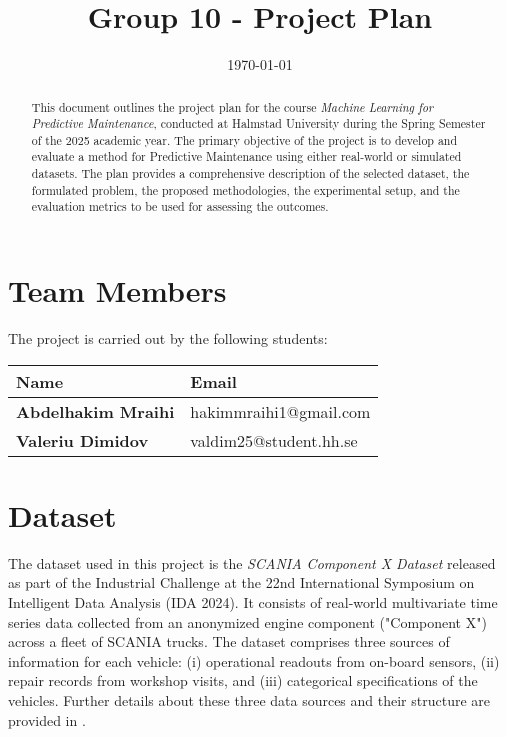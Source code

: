 \documentclass[a4paper,12pt]{article}
\title{Group 10 - Project Plan}
\date{\today}
\begin{document}
\maketitle

\begin{abstract}
This document outlines the project plan for the course \textit{Machine Learning for Predictive Maintenance}, conducted at Halmstad University during the Spring Semester of the 2025 academic year.
The primary objective of the project is to develop and evaluate a method for Predictive Maintenance using either real-world or simulated datasets. 
The plan provides a comprehensive description of the selected dataset, the formulated problem, the proposed methodologies, the experimental setup, and the evaluation metrics to be used for assessing the outcomes.

\end{abstract}

\section{Team Members}
The project is carried out by the following students:

\begin{table}[h!]
\centering
\renewcommand{\arraystretch}{1.2} %
\begin{tabularx}{0.8\textwidth}{>{\bfseries}l X}
Name & Email \\
\hline
Abdelhakim Mraihi & hakimmraihi1@gmail.com \\
Valeriu Dimidov   & valdim25@student.hh.se \\
\end{tabularx}
\end{table}

\section{Dataset}

The dataset used in this project is the \textit{SCANIA Component X Dataset} released as part of the Industrial Challenge at the 22nd International Symposium on Intelligent Data Analysis (IDA 2024). 
It consists of real-world multivariate time series data collected from an anonymized engine component ("Component X") across a fleet of SCANIA trucks. The dataset comprises three sources of information for each vehicle: (i) operational readouts from on-board sensors, (ii) repair records from workshop visits, and (iii) categorical specifications of the vehicles.
Further details about these three data sources and their structure are provided in \cite{scania_dataset_paper}.
\end{document}
